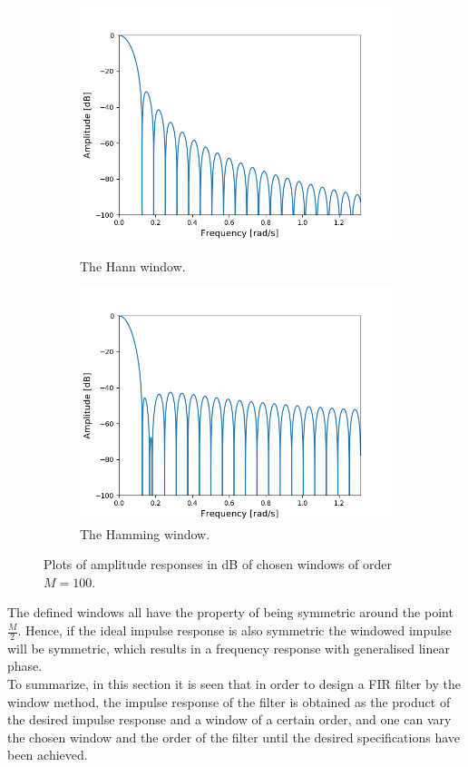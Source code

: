 \begin{figure}[H]
\begin{subfigure}{0.49\textwidth}
\includegraphics[width=\textwidth]{figures/dbplots/hann.png}
\caption{The Hann window.}
\label{fig:hann_db}
\includegraphics[width=\textwidth]{figures/dbplots/hamming.png}
\caption{The Hamming window.}
\label{fig:hamming_db}
\end{subfigure}
\caption{Plots of amplitude responses in dB of chosen windows of order $M=100$.}
\label{fig:windows}
\end{figure}

The defined windows all have the property of being symmetric around the point $\frac{M}{2}$. Hence, if the ideal impulse response is also symmetric the windowed impulse will be symmetric, which results in a frequency response with generalised linear phase. \\
To summarize, in this section it is seen that in order to design a FIR filter by the window method, the impulse response of the filter is obtained as the product of the desired impulse response and a window of a certain order, and one can vary the chosen window and the order of the filter until the desired specifications have been achieved.

